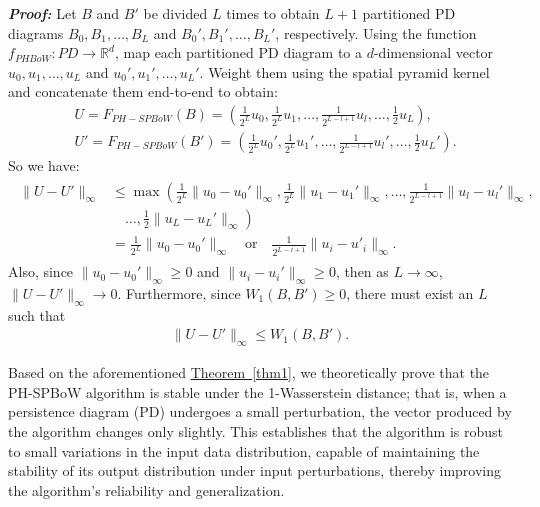 \documentclass[5GeSdc,ASOC,numref,printGA,printHL,CASflow,nocrossmark,longtitle,PROOF]{/usr/local/texlive/iTemplates/01-Templates/01-Els-Jnl/01-Standard_Templates/V1/ELS_MDL5-V1-6}
\begin{document}
\begin{articlestyle}
\textit{\textbf{Proof:}} Let $ B $ and $ B' $ be divided $ L $ times to obtain $ L + 1 $ partitioned PD diagrams $ B_0, B_1, \ldots, B_L $ and $ B_0', B_1', \ldots, B_L' $, respectively. Using the function $ f_{PHBoW}: PD \to \mathbb{R}^d $, map each partitioned PD diagram to a $ d $-dimensional vector $ u_0, u_1, \ldots, u_L $ and $ u_0', u_1', \ldots, u_L' $. Weight them using the spatial pyramid kernel and concatenate them end-to-end to obtain:  
\begin{align*}  
&U = F_{PH-SPBoW}(B) = \left( \frac{1}{2^L} u_0, \frac{1}{2^L} u_1, \ldots, \frac{1}{2^{L-l+1}} u_l,\ldots,\frac{1}{2} u_L \right),  \\
&U' = F_{PH-SPBoW}(B') = \left( \frac{1}{2^L} u_0', \frac{1}{2^L} u_1', \ldots, \frac{1}{2^{L-l+1}} u_l',\ldots,\frac{1}{2} u_L' \right).  
\end{align*}  
So we have:  
\begin{align*}  
	\begin{aligned}  
		\| U - U' \|_\infty & \leq \max \left(   
		\frac{1}{2^L} \| u_0 - u_0' \|_\infty,   
		\frac{1}{2^L} \| u_1 - u_1' \|_\infty, \ldots,   
		\frac{1}{2^{L-l+1}} \| u_l - u_l' \|_\infty,\right.\\
		&\quad{}\left.\ldots, \frac{1}{2} \| u_L - u_L' \|_\infty   
		\right) \\
		& = \frac{1}{2^L} \| u_0 - u_0' \|_\infty   
		\quad \text{or} \quad   
		\frac{1}{2^{L - i + 1}} \| u_i - u'_i \|_\infty. 
	\end{aligned}  
\end{align*} 
Also, since $ \| u_0 - u_0' \|_\infty \geq 0 $ and $ \| u_i - u_i' \|_\infty \geq 0 $, then as $ L \to \infty $, $ \| U - U' \|_\infty \to 0 $. Furthermore, since $ W_1(B, B') \geq 0 $, there must exist an $ L $ such that  
\begin{align*}  
\| U - U' \|_\infty \leq W_1(B, B').  
\end{align*}  

Based on the aforementioned \hyperref[thm1]{Theorem~\ref{thm1}}, we theoretically prove that the PH-SPBoW algorithm is stable under the 1-Wasserstein distance; that is, when a persistence diagram (PD) undergoes a small perturbation, the vector produced by the algorithm changes only slightly. This establishes that the algorithm is robust to small variations in the input data distribution, capable of maintaining the stability of its output distribution under input perturbations, thereby improving the algorithm's reliability and generalization.


\end{articlestyle}
\end{document}
